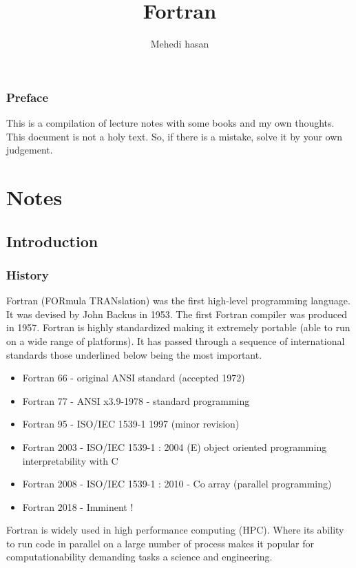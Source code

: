 \documentclass[12pt,oneside]{book}
\begin{document}
    \title{Fortran}
    \author{Mehedi hasan}
    \maketitle
    \newpage
    \section*{Preface}
    This is a compilation of lecture notes with some books and my own thoughts. This document is not a holy text. So, if there is a mistake, solve it by your own judgement.
    \newpage
    \tableofcontents
    \newpage
    \lstlistoflistings
    \newpage
    \part{Notes}
    \chapter{Introduction}
    \section{History}
    Fortran (FORmula TRANslation) was the first high-level programming language.
    It was devised by John Backus in 1953. 
    The first Fortran compiler was produced in 1957. 
    Fortran is highly standardized making it extremely portable (able to run on a wide range of platforms).
    It has passed through a sequence of international standards those underlined below being the most important.
    \begin{itemize}
        \item Fortran 66 - original ANSI standard (accepted 1972)
        \item Fortran 77 - ANSI x3.9-1978 - standard programming
        \item Fortran 95 - ISO/IEC 1539-1 1997 (minor revision)
        \item Fortran 2003 - ISO/IEC 1539-1 : 2004 (E) object oriented programming interpretability with C
        \item Fortran 2008 - ISO/IEC 1539-1 : 2010 - Co array (parallel programming)
        \item Fortran 2018 - Imminent !
    \end{itemize}
    Fortran is widely used in high performance computing (HPC). Where its ability to run code in parallel on a large number of process makes it popular for computationability demanding tasks a science and engineering.
\end{document}
